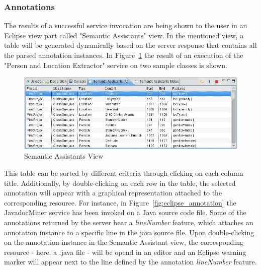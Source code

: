\subsubsection{Annotations}
The results of a successful service invocation are being shown to the user in an
Eclipse view part called "Semantic Assistants" view. In the mentioned view, a
table will be generated dynamically based on the server response that contains
all the parsed annotation instances. In Figure~\ref{fig:eclipse_saView} the
result of an execution of the "Person and Location Extractor" service on two
sample classes is shown.
\begin{figure}[htb]
\begin{center}
  \includegraphics[width=1\textwidth]{pictures/eclipse_saView.jpg}
  \caption{Semantic Assistants View}
  \label{fig:eclipse_saView}
\end{center}
\end{figure}

This table can be sorted by different criteria through clicking on each column
title. Additionally, by double-clicking on each row in the table, the selected
annotation will appear with a graphical representation attached to the
corresponding resource. For instance, in Figure~\ref{fig:eclipse_annotation} the
JavadocMiner service has been invoked on a Java source code file. Some of the
annotations returned by the server bear a \emph{lineNumber} feature, which
attaches an annotation instance to a specific line in the java source file. Upon
double-clicking on the annotation instance in the Semantic Assistant view, the
corresponding resource - here, a .java file - will be opend in an editor and an
Eclipse warning marker will appear next to the line defined by the annotation
\emph{lineNumber} feature.

